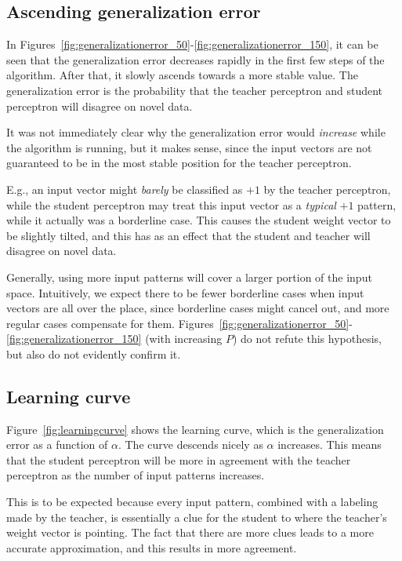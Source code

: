 \subsection{Ascending generalization error}
In Figures~\ref{fig:generalizationerror_50}-\ref{fig:generalizationerror_150}, it can be seen that the generalization error decreases rapidly in the first few steps of the algorithm.
After that, it slowly ascends towards a more stable value.
The generalization error is the probability that the teacher perceptron and student perceptron will disagree on novel data.

It was not immediately clear why the generalization error would \emph{increase} while the algorithm is running, but it makes sense, since the input vectors are not guaranteed to be in the most stable position for the teacher perceptron.

E.g., an input vector might \emph{barely} be classified as \(+1\) by the teacher perceptron, while the student perceptron may treat this input vector as a \emph{typical} \(+1\) pattern, while it actually was a borderline case.
This causes the student weight vector to be slightly tilted, and this has as an effect that the student and teacher will disagree on novel data.

Generally, using more input patterns will cover a larger portion of the input space.
Intuitively, we expect there to be fewer borderline cases when input vectors are all over the place, since borderline cases might cancel out, and more regular cases compensate for them.
Figures~\ref{fig:generalizationerror_50}-\ref{fig:generalizationerror_150} (with increasing \(P\)) do not refute this hypothesis, but also do not evidently confirm it.

\subsection{Learning curve}
Figure~\ref{fig:learningcurve} shows the learning curve, which is the generalization error as a function of \(\alpha\).
The curve descends nicely as \(\alpha\) increases.
This means that the student perceptron will be more in agreement with the teacher perceptron as the number of input patterns increases.

This is to be expected because every input pattern, combined with a labeling made by the teacher, is essentially a clue for the student to where the teacher's weight vector is pointing.
The fact that there are more clues leads to a more accurate approximation, and this results in more agreement.